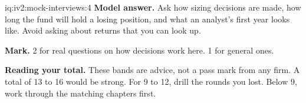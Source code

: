 \begin{solution}{iq:iv2:mock-interviews:4}
\ivstop
\textbf{Model answer.} Ask how sizing decisions are made, how long the fund will hold a losing position, and what an analyst's first year looks like. Avoid asking about returns that you can look up.

\textbf{Mark.} 2 for real questions on how decisions work here. 1 for general ones.

\medskip
\textbf{Reading your total.} These bands are advice, not a pass mark from any firm. A total of 13 to 16 would be strong. For 9 to 12, drill the rounds you lost. Below 9, work through the matching chapters first.

\end{solution}


